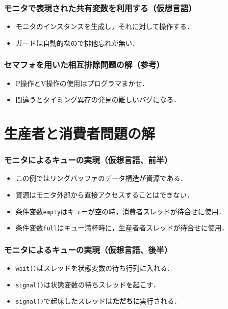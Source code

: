\documentclass[dvipdfmx]{beamer}
\begin{document}
\begin{frame}
  \frametitle{モニタで表現された共有変数を利用する（仮想言語）}
  

  \begin{itemize}
  \item モニタのインスタンスを生成し，それに対して操作する．
  \item ガードは自動的なので排他忘れが無い．
  \end{itemize}
\end{frame}

\begin{frame}
  \frametitle{セマフォを用いた相互排除問題の解（参考）}
  

  \begin{itemize}
  \item P操作とV操作の使用はプログラマまかせ．
  \item 間違うとタイミング異存の発見の難しいバグになる．
  \end{itemize}
\end{frame}

\section{生産者と消費者問題の解}
\begin{frame}
  \frametitle{モニタによるキューの実現（仮想言語、前半）}
  

  \begin{itemize}
  \item この例ではリングバッファのデータ構造が資源である．
  \item 資源はモニタ外部から直接アクセスすることはできない．
  \item 条件変数{\tt empty}はキューが空の時，消費者スレッドが待合せに使用．
  \item 条件変数{\tt full}はキュー満杯時に，生産者者スレッドが待合せに使用．
  \end{itemize}
\end{frame}

\begin{frame}
  \frametitle{モニタによるキューの実現（仮想言語、後半）}
  

  \begin{itemize}
  \item {\tt wait()}はスレッドを状態変数の待ち行列に入れる．
  \item {\tt signal()}は状態変数の待ちスレッドを起こす．
  \item {\tt signal()}で起床したスレッドは{\bf ただちに}実行される．
  \end{itemize}
\end{frame}
\end{document}
